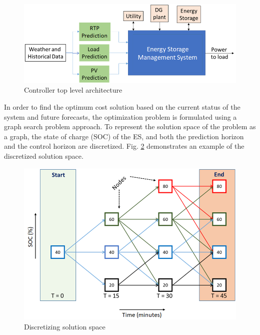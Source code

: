 \begin{figure}[!ht]
    \centering
    \includegraphics[width = 0.8\linewidth]{figs/A8/EMS_FIG.png}
    \caption{Controller top level architecture}
    \label{fig:F1_CA}
\end{figure}

In order to find the optimum cost solution based on the current status of the system and future forecasts, the optimization problem is formulated using a graph search problem approach. To represent the solution space of the problem as a graph, the state of charge (SOC) of the ES, and both the prediction horizon and the control horizon are discretized. Fig. \ref{fig:F1_Dis} demonstrates an example of the discretized solution space.
\begin{figure}[!ht]
    \centering
    \includegraphics[width = 0.8\linewidth]{figs/A8/F1_1_Dis.png}
    \caption{Discretizing solution space}
    \label{fig:F1_Dis}
\end{figure}
